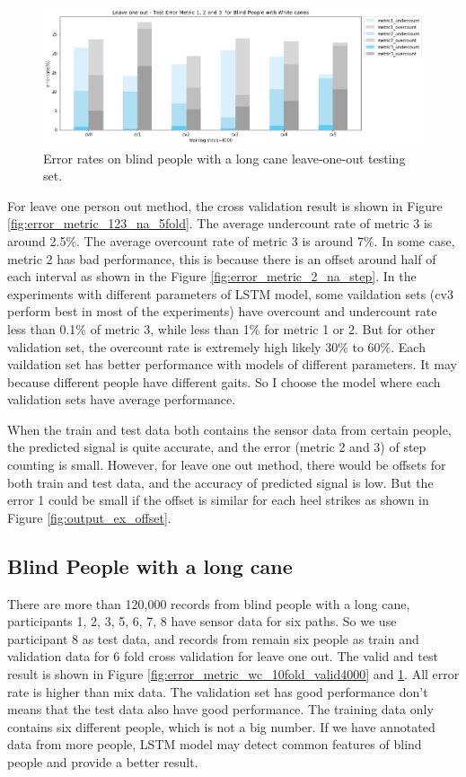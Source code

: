 \documentclass[11pt]{article}
\begin{document}
{\begin{figure}[ht]
\centering
\includegraphics[scale=0.5]{error_metric_wc_10fold_test4000}
\caption{Error rates on blind people with a long cane leave-one-out testing set.}
\label{fig:error_metric_wc_10fold_test4000}
\end{figure}

For leave one person out method, the cross validation result is shown in Figure \ref{fig:error_metric_123_na_5fold}.
The average undercount rate of metric 3 is around 2.5\%. The average overcount rate of metric 3 is around 7\%.
 In some case, metric 2 has bad performance, this is because there is an offset around half of each interval as shown in the Figure  \ref{fig:error_metric_2_na_step}. 
 In the experiments with different parameters of LSTM model,  some vaildation sets (cv3 perform best in most of the experiments) have overcount and undercount rate less than 0.1\% of metric 3, while less than 1\% for metric 1 or 2. But for other validation set, the overcount rate is extremely high likely 30\% to 60\%. Each vaildation set has better performance with models of different parameters. It may because different people have different gaits. So I choose the model where each validation sets have average performance. 

When the train and test data both contains the sensor data from certain people,  the predicted signal is quite accurate, and the error (metric 2 and 3) of step counting is small. However, for leave one out method, there would be offsets for both train and test data, and the accuracy of predicted signal is low. But the error 1 could be small if the offset is similar for each heel strikes as shown in Figure \ref{fig:output_ex_offset}. 

\subsection{Blind People with a long cane}
There are more than 120,000 records from blind people with a long cane, participants 1, 2, 3, 5, 6, 7, 8 have sensor data for six paths. So we use participant 8 as test data, and records from remain six people as train and validation data for 6 fold cross validation for leave one out. The valid and test result is shown in Figure \ref{fig:error_metric_wc_10fold_valid4000} and \ref{fig:error_metric_wc_10fold_test4000}. All error rate is higher than mix data. The validation set has good performance don't means that the test data also have good performance.
The training data only contains six different people, which is not a big number. If we have annotated data from more people, LSTM model may detect common features of blind people and provide a better result.

}
\end{document}
